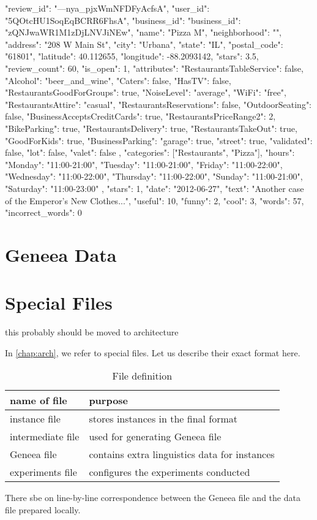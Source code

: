 \begin{code}
{
	"review_id": "---nya_pjxWmNFDFyAcfsA",
	"user_id": "5QOtcHU1SoqEqBCRR6FhsA",
	"business_id": {
		"business_id": "zQNJwaWR1M1zDjLNVJiNEw",
		"name": "Pizza M",
		"neighborhood": "",
		"address": "208 W Main St",
		"city": "Urbana",
		"state": "IL",
		"postal_code": "61801",
		"latitude": 40.112655,
		"longitude": -88.2093142,
		"stars": 3.5,
		"review_count": 60,
		"is_open": 1,
		"attributes": {
			"RestaurantsTableService": false,
			"Alcohol": "beer_and_wine",
			"Caters": false,
			"HasTV": false,
			"RestaurantsGoodForGroups": true,
			"NoiseLevel": "average",
			"WiFi": "free",
			"RestaurantsAttire": "casual",
			"RestaurantsReservations": false,
			"OutdoorSeating": false,
			"BusinessAcceptsCreditCards": true,
			"RestaurantsPriceRange2": 2,
			"BikeParking": true,
			"RestaurantsDelivery": true,
			"RestaurantsTakeOut": true,
			"GoodForKids": true,
			"BusinessParking": {
				"garage": true,
				"street": true,
				"validated": false,
				"lot": false,
				"valet": false
			}
		},
		"categories": ["Restaurants", "Pizza"],
		"hours": {
			"Monday": "11:00-21:00",
			"Tuesday": "11:00-21:00",
			"Friday": "11:00-22:00",
			"Wednesday": "11:00-22:00",
			"Thursday": "11:00-22:00",
			"Sunday": "11:00-21:00",
			"Saturday": "11:00-23:00"
		}
	},
	"stars": 1,
	"date": "2012-06-27",
	"text": "Another case of the Emperor's New Clothes...",
	"useful": 10,
	"funny": 2,
	"cool": 3,
	"words": 57,
	"incorrect_words": 0
}
\end{code}


\section{Geneea Data}




\section{Special Files}

this probably should be moved to architecture

In \autoref{chap:arch}, we refer to special files.
Let us describe their exact format here.

\begin{table}[h]

\centering
\begin{tabular}{ll}
\toprule
\textbf{name of file}& \textbf{purpose} \\
\midrule
instance file		 & stores instances in the final format \\
intermediate file	 & used for generating Geneea file \\
Geneea file			 & contains extra linguistics data for instances \\
experiments file	 & configures the experiments conducted \\
\bottomrule
\end{tabular}

\caption{File definition}\label{tab:files}
\end{table}
There sbe on line-by-line correspondence between the Geneea file and the data file prepared locally.

